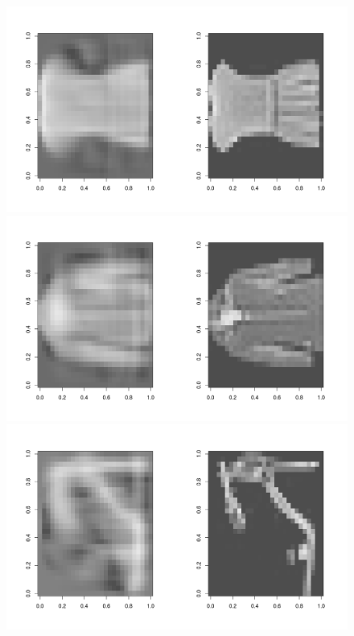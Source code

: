 \documentclass{article}
\begin{document}
\begin{figure}[H] 
\centering
\includegraphics[width=\textwidth, trim=0 0 0 5cm]{pca_reconst_3.png}
\includegraphics[width=\textwidth]{pca_reconst_4.png}
\includegraphics[width=\textwidth]{pca_reconst_5.png}
\label{fig:pca_ellipse}
\end{figure}
\end{document}
